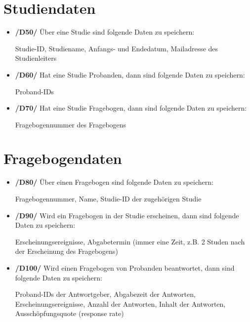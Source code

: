 \documentclass[a4paper]{scrreprt}
\begin{document}
        \section{Studiendaten}
            \begin{itemize}
                \item \textbf{/D50/} Über eine Studie sind folgende Daten zu speichern:
                    \par Studie-ID, Studiename, Anfangs- und Endedatum, Mailadresse des \gls{Studienleiter}s

                \item \textbf{/D60/} Hat eine Studie \gls{Proband}en, dann sind folgende Daten zu speichern:
                    \par \gls{Proband}-IDs

                \item \textbf{/D70/} Hat eine Studie Fragebogen, dann sind folgende Daten zu speichern:
                    \par Fragebogennummer des Fragebogens
            \end{itemize}

        \section{Fragebogendaten}
            \begin{itemize}
                \item \textbf{/D80/} Über einen Fragebogen sind folgende Daten zu speichern:
                \par Fragebogennummer, Name, Studie-ID der zugehörigen Studie

                \item \textbf{/D90/} Wird ein Fragebogen in der Studie erscheinen, dann sind folgende Daten zu speichern:
                \par \gls{Erscheinungsereignis}se, Abgabetermin (immer eine Zeit, z.B. 2 Studen nach der Erscheinung des Fragebogens)

                \item \textbf{/D100/} Wird einen Fragebogen von \gls{Proband}en beantwortet, dann sind folgende Daten zu speichern:
                \par \gls{Proband}-IDs der Antwortgeber, Abgabezeit der Antworten, \gls{Erscheinungsereignis}se, Anzahl der Antworten, Inhalt der Antworten, Ausschöpfungsquote (response rate)
            \end{itemize}
\end{document}
